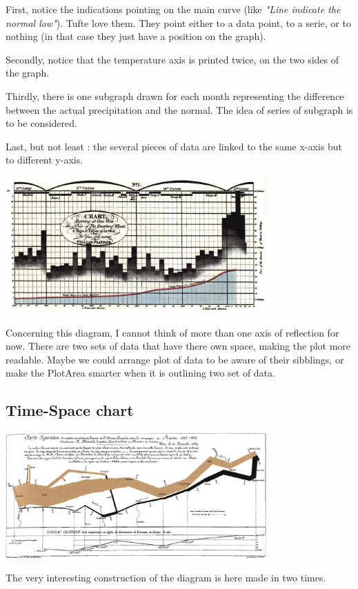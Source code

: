 First, notice the indications pointing on the main curve (like \emph{"Line indicate the normal low"}). Tufte love them.
 They point either to a data point, to a serie, or to nothing (in that case they just have a position on the graph).

Secondly, notice that the temperature axis is printed twice, on the two sides of the graph.

Thirdly, there is one subgraph drawn for each month representing the difference between the actual precipitation and the normal.
 The idea of series of subgraph is to be considered.

Last, but not least : the several pieces of data are linked to the same x-axis but to different y-axis.

\centerline{
\includegraphics[width=10cm]{./illustrations/annexes/temps_ble.eps}
}
Concerning this diagram, I cannot think of more than one axis of reflection for now. There are two sets of data that have there own space, making the plot more readable. Maybe we could arrange plot of data to be aware of their sibblings, or make the PlotArea smarter when it is outlining two set of data.


\subsection{Time-Space chart}
\centerline{
\includegraphics[width=10cm]{./illustrations/annexes/tempscarte_napoleon.eps}
}
The very interesting construction of the diagram is here made in two times.

